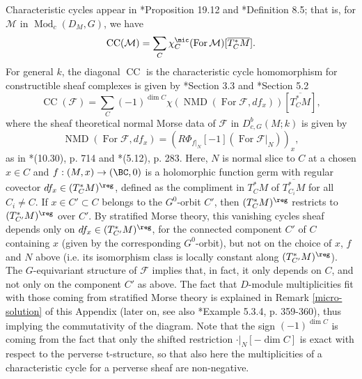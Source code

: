 \documentclass[11pt,letterpaper]{amsart}
\numberwithin{equation}{section}
\begin{document}
\begin{itemize}
Characteristic cycles appear in \cite{ABV92}*{Proposition 19.12} and \cite{Vog93}*{Definition 8.5}; that is, 
for $\mathcal{M}$ in $\operatorname{Mod}_{c}(D_M,G)$, we have 
\begin{equation}\label{equation: CCM}
\operatorname{CC}(\mathcal{M})
=
\sum_{C} \chi^\mic_C(\operatorname{For}\mathcal{M}) [\overline{T^*_C M}].
\end{equation}
For general $k$, the diagonal $\operatorname{CC}$
is the characteristic cycle homomorphism
for constructible sheaf complexes is given by \cite{MS22}*{Section 3.3} and \cite{Sch03}*{Section 5.2}
\begin{equation}
\operatorname{CC}(\mathcal{F}) = \sum_{C} (-1)^{\dim C} \chi(\operatorname{NMD}(\operatorname{For}\mathcal{F},df_x)) [\overline{T^*_C M}],
\end{equation}
where the sheaf theoretical normal Morse data of $\mathcal{F}$ in $D^b_{c,G}(M;k)$ is given by
\begin{equation}\label{equation: A 5}
\operatorname{NMD}(\operatorname{For}\mathcal{F},df_x)
=
\left(R\Phi_{f\vert_{N}}[-1](\operatorname{For}\mathcal{F}\vert_{N})\right)_x,
\end{equation}
as in \cite{MS22}*{(10.30), p. 714} and \cite{Sch03}*{(5.12), p. 283}.
Here, $N$ is normal slice to $C$ at  a chosen $x\in C$ and $f : (M,x) \to (\BC,0)$ is a holomorphic function germ with regular covector $df_x \in (T^*_C M)^\reg$, defined as the compliment in $T^*_C M$ of  $\overline{T^*_{C_i} M}$ for all $C_i \ne C$. If $x\in C'\subset C$ belongs to the $G^0$-orbit $C'$, then $(T^*_C M)^\reg$ restricts to $(T^*_{C'} M)^\reg$ over $C'$.
By stratified Morse theory, this vanishing cycles sheaf depends only on $df_x\in (T^*_{C'} M)^\reg$, for the connected component $C'$ of $C$ containing $x$ (given by the corresponding $G^0$-orbit), but not on the choice of $x$, $f$ and $N$ above (i.e. its isomorphism class is locally constant along $(T^*_{C'} M)^\reg$).
The $G$-equivariant structure of $\mathcal{F}$ implies that, in fact, it only depends on $C$, and not only on the component $C'$ as above.
The fact that $D$-module multiplicities fit with those coming from stratified Morse theory is explained in Remark \ref{micro-solution}
of this Appendix (later on,
see also \cite{Sch03}*{Example 5.3.4, p. 359-360}), thus implying the commutativity of the diagram. Note that the sign $(-1)^{\dim C}$ is coming from the fact that only the shifted restriction $\cdot \vert_{N}[-\dim C]$ is exact with respect to the perverse t-structure, so that also here the multiplicities of a characteristic cycle for a perverse sheaf are non-negative.

\end{itemize}
\end{document}
